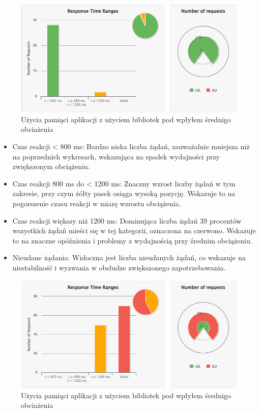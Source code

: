 \documentclass[runningheads,12pt]{llncs}
\begin{document}
\begin{figure}
    \includegraphics[width=\linewidth]{images/sdk-gatling-middle-graph.jpg}
    \caption{Użycia pamiąci aplikacji z użyciem bibliotek pod wpłyłem średnigo obciażenia} \label{fig1}
\end{figure}

\begin{itemize} 
    \item Czas reakcji < 800 ms: Bardzo niska liczba żądań, zauważalnie mniejsza niż na poprzednich wykresach, wskazująca na spadek wydajności przy zwiększonym obciążeniu.
    \item Czas reakcji 800 ms do < 1200 ms: Znaczny wzrost liczby żądań w tym zakresie, przy czym żółty pasek osiąga wysoką pozycję. Wskazuje to na pogorszenie czasu reakcji w miarę wzrostu obciążenia.
    \item Czas reakcji większy niż 1200 ms: Dominująca liczba żądań 39 procentów wszystkich żądań mieści się w tej kategorii, oznaczona na czerwono. Wskazuje to na znaczne opóźnienia i problemy z wydajnością przy średnim obciążeniu.
    \item Nieudane żądania: Widoczna jest liczba nieudanych żądań, co wskazuje na niestabilność i wyzwania w obsłudze zwiększonego zapotrzebowania.
\end{itemize}

\begin{figure}
    \includegraphics[width=\linewidth]{images/sdk-gatling-high-graph.jpg}
    \caption{Użycia pamiąci aplikacji z użyciem bibliotek pod wpłyłem średnigo obciażenia} \label{fig1}
\end{figure}
\end{document}
